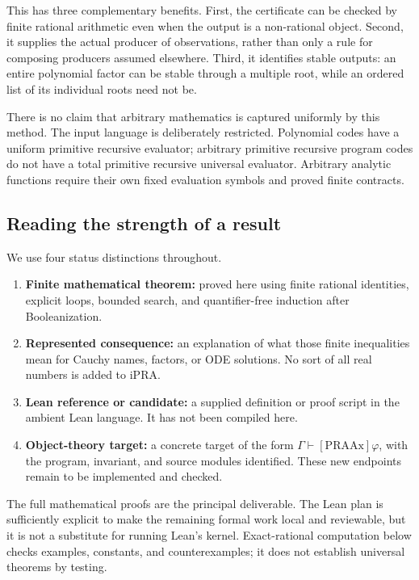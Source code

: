This has three complementary benefits. First, the certificate can be checked by finite rational arithmetic even when the output is a non-rational object. Second, it supplies the actual producer of observations, rather than only a rule for composing producers assumed elsewhere. Third, it identifies stable outputs: an entire polynomial factor can be stable through a multiple root, while an ordered list of its individual roots need not be.

There is no claim that arbitrary mathematics is captured uniformly by this method. The input language is deliberately restricted. Polynomial codes have a uniform primitive recursive evaluator; arbitrary primitive recursive program codes do not have a total primitive recursive universal evaluator. Arbitrary analytic functions require their own fixed evaluation symbols and proved finite contracts.

\subsection{Reading the strength of a result}

We use four status distinctions throughout.
\begin{enumerate}[leftmargin=*,itemsep=2pt]
\item \textbf{Finite mathematical theorem:} proved here using finite rational identities, explicit loops, bounded search, and quantifier-free induction after Booleanization.
\item \textbf{Represented consequence:} an explanation of what those finite inequalities mean for Cauchy names, factors, or ODE solutions. No sort of all real numbers is added to iPRA.
\item \textbf{Lean reference or candidate:} a supplied definition or proof script in the ambient Lean language. It has not been compiled here.
\item \textbf{Object-theory target:} a concrete target of the form \(\Gamma\vdash[\mathrm{PRAAx}]\varphi\), with the program, invariant, and source modules identified. These new endpoints remain to be implemented and checked.
\end{enumerate}

The full mathematical proofs are the principal deliverable. The Lean plan is sufficiently explicit to make the remaining formal work local and reviewable, but it is not a substitute for running Lean's kernel. Exact-rational computation below checks examples, constants, and counterexamples; it does not establish universal theorems by testing.
